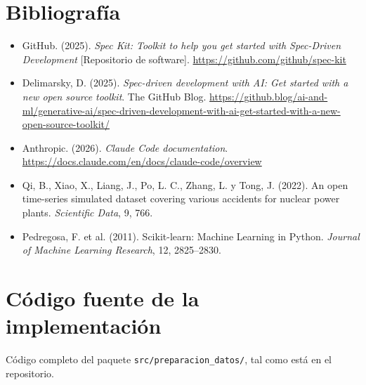 \documentclass[12pt,a4paper]{article}
\begin{document}
\section{Bibliografía}
\begin{itemize}
  \item GitHub. (2025). \textit{Spec Kit: Toolkit to help you get started with Spec-Driven Development} [Repositorio de software]. \url{https://github.com/github/spec-kit}
  \item Delimarsky, D. (2025). \textit{Spec-driven development with AI: Get started with a new open source toolkit}. The GitHub Blog. \url{https://github.blog/ai-and-ml/generative-ai/spec-driven-development-with-ai-get-started-with-a-new-open-source-toolkit/}
  \item Anthropic. (2026). \textit{Claude Code documentation}. \url{https://docs.claude.com/en/docs/claude-code/overview}
  \item Qi, B., Xiao, X., Liang, J., Po, L. C., Zhang, L. y Tong, J. (2022). An open time-series simulated dataset covering various accidents for nuclear power plants. \textit{Scientific Data}, 9, 766.
  \item Pedregosa, F. et al. (2011). Scikit-learn: Machine Learning in Python. \textit{Journal of Machine Learning Research}, 12, 2825--2830.
\end{itemize}

\newpage
\appendix
\section{Código fuente de la implementación}
\label{anexo:codigo}
Código completo del paquete \texttt{src/preparacion\_datos/}, tal como está en el repositorio.
\end{document}
